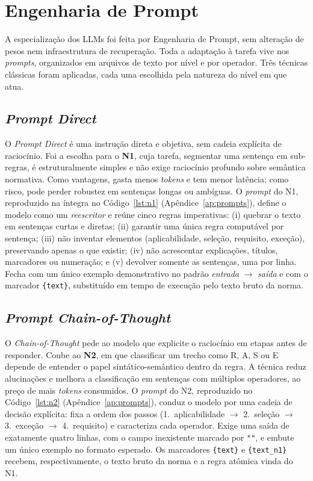 \section{Engenharia de Prompt}

A especialização dos LLMs foi feita por Engenharia de Prompt, sem alteração de pesos nem infraestrutura de recuperação. Toda a adaptação à tarefa vive nos \textit{prompts}, organizados em arquivos de texto por nível e por operador. Três técnicas clássicas foram aplicadas, cada uma escolhida pela natureza do nível em que atua.

\subsection{\textit{Prompt Direct}}

O \textit{Prompt Direct} é uma instrução direta e objetiva, sem cadeia explícita de raciocínio. Foi a escolha para o \textbf{N1}, cuja tarefa, segmentar uma sentença em sub-regras, é estruturalmente simples e não exige raciocínio profundo sobre semântica normativa. Como vantagens, gasta menos \textit{tokens} e tem menor latência; como risco, pode perder robustez em sentenças longas ou ambíguas. O \textit{prompt} do N1, reproduzido na íntegra no Código~\ref{lst:n1} (Apêndice~\ref{ap:prompts}), define o modelo como um \emph{reescritor} e reúne cinco regras imperativas: (i) quebrar o texto em sentenças curtas e diretas; (ii) garantir uma única regra computável por sentença; (iii) não inventar elementos (aplicabilidade, seleção, requisito, exceção), preservando apenas o que existir; (iv) não acrescentar explicações, títulos, marcadores ou numeração; e (v) devolver somente as sentenças, uma por linha. Fecha com um único exemplo demonstrativo no padrão \textit{entrada} $\rightarrow$ \textit{saída} e com o marcador \verb|{text}|, substituído em tempo de execução pelo texto bruto da norma.

\subsection{\textit{Prompt Chain-of-Thought}}

O \textit{Chain-of-Thought} pede ao modelo que explicite o raciocínio em etapas antes de responder. Coube ao \textbf{N2}, em que classificar um trecho como R, A, S ou E depende de entender o papel sintático-semântico dentro da regra. A técnica reduz alucinações e melhora a classificação em sentenças com múltiplos operadores, ao preço de mais \textit{tokens} consumidos. O \textit{prompt} do N2, reproduzido no Código~\ref{lst:n2} (Apêndice~\ref{ap:prompts}), conduz o modelo por uma cadeia de decisão explícita: fixa a ordem dos passos (1.~aplicabilidade $\rightarrow$ 2.~seleção $\rightarrow$ 3.~exceção $\rightarrow$ 4.~requisito) e caracteriza cada operador. Exige uma saída de exatamente quatro linhas, com o campo inexistente marcado por \verb|""|, e embute um único exemplo no formato esperado. Os marcadores \verb|{text}| e \verb|{text_n1}| recebem, respectivamente, o texto bruto da norma e a regra atômica vinda do N1.

